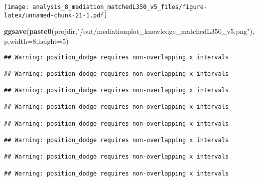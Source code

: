 \documentclass[
]{article}
\newenvironment{Shaded}{\begin{snugshade}}{\end{snugshade}}
\newcommand{\DataTypeTok}[1]{\textcolor[rgb]{0.13,0.29,0.53}{#1}}
\newcommand{\DecValTok}[1]{\textcolor[rgb]{0.00,0.00,0.81}{#1}}
\newcommand{\KeywordTok}[1]{\textcolor[rgb]{0.13,0.29,0.53}{\textbf{#1}}}
\newcommand{\NormalTok}[1]{#1}
\newcommand{\StringTok}[1]{\textcolor[rgb]{0.31,0.60,0.02}{#1}}
\begin{document}
\texttt{[image: analysis\_8\_mediation\_matchedL350\_v5\_files/figure-latex/unnamed-chunk-21-1.pdf]}

\begin{Shaded}
\begin{Highlighting}[]
\KeywordTok{ggsave}\NormalTok{(}\KeywordTok{paste0}\NormalTok{(projdir,}\StringTok{"/out/mediationplot_knowledge_matchedL350_v5.png"}\NormalTok{),p,}\DataTypeTok{width=}\DecValTok{8}\NormalTok{,}\DataTypeTok{height=}\DecValTok{5}\NormalTok{)}
\end{Highlighting}
\end{Shaded}

\begin{verbatim}
## Warning: position_dodge requires non-overlapping x intervals

## Warning: position_dodge requires non-overlapping x intervals

## Warning: position_dodge requires non-overlapping x intervals

## Warning: position_dodge requires non-overlapping x intervals

## Warning: position_dodge requires non-overlapping x intervals

## Warning: position_dodge requires non-overlapping x intervals

## Warning: position_dodge requires non-overlapping x intervals

## Warning: position_dodge requires non-overlapping x intervals
\end{verbatim}
\end{document}

